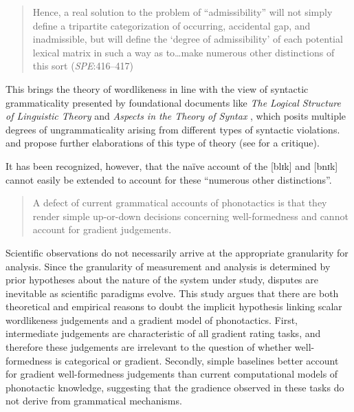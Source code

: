 \begin{quote}
Hence, a real solution to the problem of ``admissibility'' will not simply define a tripartite categorization of occurring, accidental gap, and inadmissible, but will define the `degree of admissibility' of each potential lexical matrix in such a way as to\ldots{}make numerous other distinctions of this sort (\emph{SPE}:416--417)
\end{quote}

\noindent
This brings the theory of wordlikeness in line with the view of syntactic grammaticality presented by foundational documents like \emph{The Logical Structure of Linguistic Theory} \citep{LSLT} and \emph{Aspects in the Theory of Syntax} \citep{ASPECTS}, which posits multiple degrees of ungrammaticality arising from different types of syntactic violations.
\citet{BARRIERS} and \citet{Huang1982} propose further elaborations of this type of theory (see \citealt[43f.]{Schutze1996} for a critique).

It has been recognized, however, that the naïve account of the [blɪk] and [bnɪk] cannot easily be extended to account for these ``numerous other distinctions''.

\begin{quote}
A defect of current grammatical accounts of phonotactics is that they render simple up-or-down decisions concerning well-formedness and cannot account for gradient judgements. \citep[371]{Shademan2006}
\end{quote}

Scientific observations do not necessarily arrive at the appropriate granularity for analysis.
Since the granularity of measurement and analysis is determined by prior hypotheses about the nature of the system under study, disputes are inevitable as scientific paradigms evolve. 
This study argues that there are both theoretical and empirical reasons to doubt the implicit hypothesis linking scalar wordlikeness judgements and a gradient model of phonotactics. First, intermediate judgements are characteristic of all gradient rating tasks, and therefore these judgements are irrelevant to the question of whether well-formedness is categorical or gradient.
Secondly, simple baselines better account for gradient well-formedness judgements than current computational models of phonotactic knowledge, suggesting that the gradience observed in these tasks do not derive from grammatical mechanisms.


